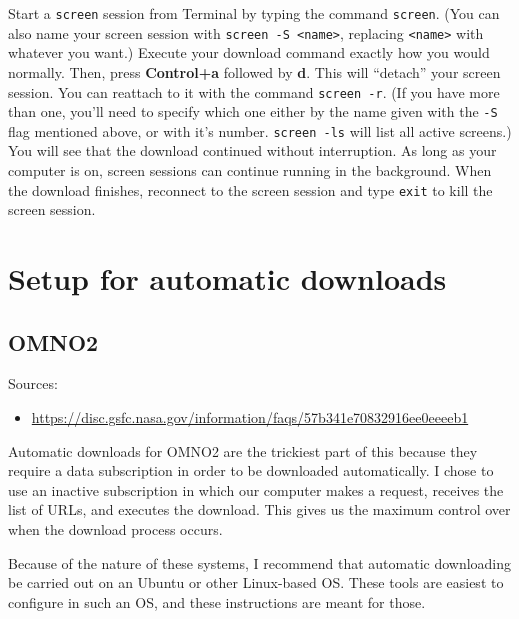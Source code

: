 \documentclass[12pt]{article}
\begin{document}
	Start a \lstinline$screen$ session from Terminal by typing the command \lstinline$screen$. (You can also name your screen session with \lstinline$screen -S <name>$, replacing \lstinline$<name>$ with whatever you want.) Execute your download command exactly how you would normally. Then, press \textbf{Control+a} followed by \textbf{d}. This will ``detach'' your screen session. You can reattach to it with the command \lstinline$screen -r$. (If you have more than one, you'll need to specify which one either by the name given with the \lstinline$-S$ flag mentioned above, or with it's number. \lstinline$screen -ls$ will list all active screens.) You will see that the download continued without interruption. As long as your computer is on, screen sessions can continue running in the background. When the download finishes, reconnect to the screen session and type \lstinline$exit$ to kill the screen session.

\section{Setup for automatic downloads} \label{app:autodl}
\subsection{OMNO2}
	Sources:
	\begin{itemize}
	\item \url{https://disc.gsfc.nasa.gov/information/faqs/57b341e70832916ee0eeeeb1}
	\end{itemize}

	Automatic downloads for OMNO2 are the trickiest part of this because they require a data subscription in order to be downloaded automatically. I chose to use an inactive subscription in which our computer makes a request, receives the list of URLs, and executes the download.  This gives us the maximum control over when the download process occurs.
	
	Because of the nature of these systems, I recommend that automatic downloading be carried out on an Ubuntu or other Linux-based OS.  These tools are easiest to configure in such an OS, and these instructions are meant for those.
	
\end{document}
